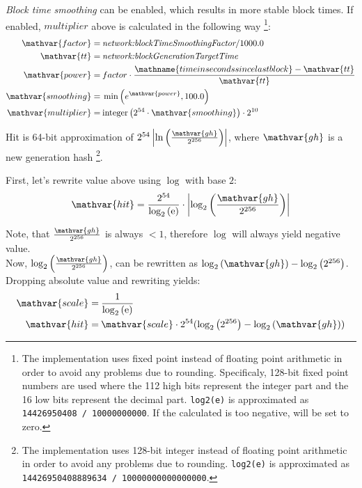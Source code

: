 \emph{Block time smoothing} can be enabled, which results in more stable block times.
If enabled, $multiplier$ above is calculated in the following way
\footnote{
	The implementation uses fixed point instead of floating point arithmetic in order to avoid any problems due to rounding.
	Specificaly, 128-bit fixed point numbers are used where the 112 high bits represent the integer part and the 16 low bits represent the decimal part.
	\texttt{log2(e)} is approximated as \texttt{14426950408 / 10000000000}.
	If the calculated  is too negative,  will be set to zero.
}:
\begin{align*}
	\mathvar{factor} = \: & \nemsetting{network}{blockTimeSmoothingFactor} / 1000.0 \\
	\mathvar{tt} = \: & \nemsetting{network}{blockGenerationTargetTime} \\
	\mathvar{power} = \: & factor \cdot \frac{\mathname{time in seconds since last block} - \mathvar{tt}}{\mathvar{tt}} \\
	\mathvar{smoothing} = \: & \min\left(e^{\mathvar{power}}, 100.0\right) \\
	\mathvar{multiplier} = \: & \mathfunc{integer}\left(2^{54} \cdot \mathvar{smoothing}\right) \cdot 2^{10}
\end{align*}

Hit is 64-bit approximation of $2^{54} \left|\ln\left(\frac{\mathvar{gh}}{2^{256}}\right)\right|$, where $\mathvar{gh}$ is a new generation hash
\footnote{
	The implementation uses 128-bit integer instead of floating point arithmetic in order to avoid any problems due to rounding.
	\texttt{log2(e)} is approximated as \texttt{14426950408889634 / 10000000000000000}.
}.

First, let's rewrite value above using $\log$ with base $2$:
$$
\mathvar{hit} = \frac{2^{54}}{\log_2\left(\euler\right)} \cdot \left|\log_2\left(\frac{\mathvar{gh}}{2^{256}}\right)\right|
$$

Note, that $\frac{\mathvar{gh}}{2^{256}}$ is always $< 1$, therefore $\log$ will always yield negative value. \\
Now, $\log_2\left(\frac{\mathvar{gh}}{2^{256}}\right)$, can be rewritten as $\log_2\left(\mathvar{gh}\right) - \log_2\left(2^{256}\right)$. \\

Dropping absolute value and rewriting yields:
\begin{align*}
	\mathvar{scale} = \: & \frac{1}{\log_2\left(\euler\right)} \\
	\mathvar{hit} = \: & \mathvar{scale} \cdot 2^{54} (\log_2\left(2^{256}\right) - \log_2\left(\mathvar{gh}\right))
\end{align*}

